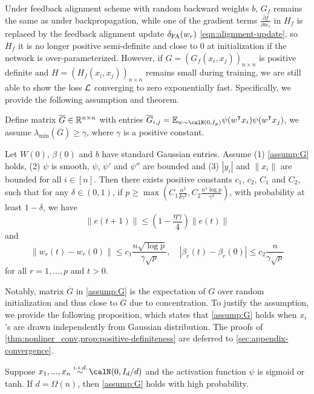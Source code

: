 Under feedback alignment scheme with random backward weights $b$, $G_f$ remains the same as under backpropagation, while one of the gradient terms $\frac{\partial f}{\partial w_r}$ in $H_f$ is replaced by the feedback alignment update $\delta_\mathrm{FA}(w_r)$ \eqref{eqn:alignment-update}, so $H_f$ it is no longer positive semi-definite and close to $0$ at initialization if the network is over-parameterized. However, if $G = (G_f(x_i,x_j))_{n\times n}$ is positive definite and $H = (H_f(x_i,x_j))_{n\times n}$ remains small during training, we are still able to show the loss $\mathcal{L}$ converging to zero exponentially fast. Specifically, we provide the following assumption and theorem.

\begin{assumption}\label{assump:G}
Define matrix $\overline{G} \in \mathbb{R}^{n\times n}$ with entries
$\overline{G}_{i,j} = \E_{w\sim \calN(0,I_p)}\psi(w\transpose x_i) \psi(w\transpose  x_j)$, we assume $\lambda_{\min}(\overline{G}) \geq \gamma$, where $\gamma$ is a positive constant.
\end{assumption}

\begin{theorem}\label{thm:nonliner_conv}
Let $W(0)$, $\beta(0)$ and $b$ have \iid standard Gaussian entries. Assume \textnormal{(1)} \cref{assump:G} holds, \textnormal{(2)} $\psi$ is smooth, $\psi$, $\psi'$ and $\psi''$ are bounded and \textnormal{(3)} $|y_i|$ and $\|x_i\|$ are bounded for all $i\in[n]$. Then there exists positive constants $c_1$, $c_2$, $C_1$ and $C_2$, such that for any $\delta\in(0,1)$, if $p \geq \max(C_1\frac{n^2}{\delta\gamma^2}, C_2\frac{n^4\log p}{\gamma^4})$, with probability at least $1-\delta$, we have
\begin{equation}\label{eq:conv}
    \|e(t+1)\| \leq (1-\frac{\eta\gamma}{4})\|e(t)\|
\end{equation}
and 
\begin{equation}
\label{eq:weights}
    \|w_r(t)-w_r(0)\| \leq c_1\frac{n\sqrt{\log p}}{\gamma\sqrt p}, \quad |\beta_r(t)-\beta_r(0)| \leq c_2\frac{n}{\gamma\sqrt p}
\end{equation}
for all $r=1,\ldots, p$ and $t>0$.
\end{theorem}

Notably, matrix $\overline{G}$ in \cref{assump:G} is the expectation of $G$ over random initialization and thus close to $\overline{G}$ due to concentration. To justify the assumption, we provide the following proposition, which states that \cref{assump:G} holds when $x_i$'s are drawn independently from Gaussian distribution. The proofs of \cref{thm:nonliner_conv,prop:positive-definiteness} are deferred to \cref{sec:appendix-convergence}.

\begin{proposition}\label{prop:positive-definiteness}
Suppose $x_1,...,x_n \overset{\iid}{\sim} \calN(0,I_d/d)$ and the activation function $\psi$ is sigmoid or tanh. If $d=\Omega(n)$, then \cref{assump:G} holds with high probability.
\end{proposition}




